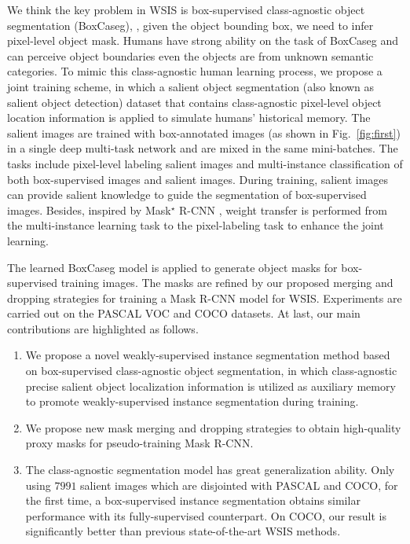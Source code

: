 \documentclass[final]{cvpr}
\begin{document}
We think the key problem in WSIS is box-supervised class-agnostic object segmentation (BoxCaseg), \ie, given the object bounding box, we need to infer pixel-level object mask. Humans have strong ability on the task of BoxCaseg and can perceive object boundaries even the objects are from unknown semantic categories. To mimic this class-agnostic human learning process, we propose a joint training scheme, in which a salient object segmentation (also known as salient object detection) dataset that contains class-agnostic pixel-level object location information is applied to simulate humans' historical memory. The salient images are trained with box-annotated images (as shown in Fig.~\ref{fig:first}) in a single deep multi-task network and are mixed in the same mini-batches. The tasks include pixel-level labeling salient images and multi-instance classification \cite{hsu2019weakly} of both box-supervised images and salient images. During training, salient images can provide salient knowledge to guide the segmentation of box-supervised images. Besides, inspired by Mask$^{\star}$ R-CNN \cite{hu2018learning}, weight transfer is performed from the multi-instance learning task to the pixel-labeling task to enhance the joint learning.

The learned BoxCaseg model is applied to generate object masks for box-supervised training images. The masks are refined by our proposed merging and dropping strategies for training a Mask R-CNN model for WSIS. Experiments are carried out on the PASCAL VOC and COCO datasets. At last, our main contributions are highlighted as follows. \vspace{-2mm}
\begin{enumerate}
\item We propose a novel weakly-supervised instance segmentation method based on box-supervised class-agnostic object segmentation, in which class-agnostic precise salient object localization information is utilized as auxiliary memory to promote weakly-supervised instance segmentation during training.
\vspace{-2mm}
\item We propose new mask merging and dropping strategies to obtain high-quality proxy masks for pseudo-training Mask R-CNN.
\vspace{-2mm}
\item The class-agnostic segmentation model has great generalization ability. Only using $7991$ salient images which are disjointed with PASCAL and COCO, for the first time, a box-supervised instance segmentation obtains similar performance with its fully-supervised counterpart. On COCO, our result is significantly better than previous state-of-the-art WSIS methods.
\end{enumerate}
\end{document}
